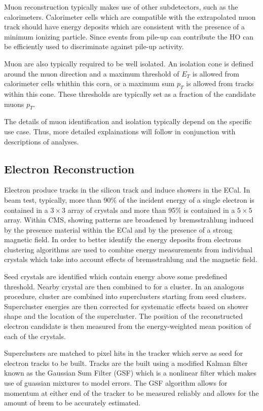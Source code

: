 Muon reconstruction typically makes use of other subdetectors, such
as the calorimeters.  Calorimeter cells which are compatible with 
the extrapolated muon track should have energy deposits which are 
consistent with the presence of a minimum ionizing particle.  
Since events from pile-up can contribute the HO can be efficiently
used to discriminate against pile-up activity.  

Muon are also typically required to be well isolated.  An isolation
cone is defined around the muon direction and a maximum threshold of 
$E_T$ is allowed from calorimeter cells whithin this corn, or a maximum
sum $p_T$ is allowed from tracks within this cone.  These thresholds are
typically set as a fraction of the candidate muons $p_T$.

The details of muon identification and isolation typically depend on
the specific use case.  Thus, more detailed explainations will follow
in conjunction with descriptions of analyses. 

\subsection{Electron Reconstruction}
\label{sec:electronRECO}

Electron produce tracks in the silicon track and induce showers 
in the ECal.  In beam test, typically, more than 90\% of the incident 
energy of a single electron is contained in a $3\times3$ array of 
crystals and more than 95\% is contained in a $5\times5$ array.  
Within CMS, showing patterns are broadened by bremsstrahlung 
induced by the presence material within the ECal and by the
presence of a strong magnetic field.  In order to better identify 
the energy deposits from electrons clustering algorithms are 
used to combine energy measurements from individual crystals which
take into account effects of bremsstrahlung and the magnetic field.  

Seed crystals are identified which contain energy above some predefined
threshold.  Nearby crystal are then combined to for a cluster.  In 
an analogous procedure, cluster are combined into superclusters 
starting from seed clusters.  Supercluster energies are then 
corrected for systematic effects based on shower shape and the
location of the supercluster.  The position of the reconstructed
electron candidate is then measured from the energy-weighted mean
position of each of the crystals.

Superclusters are matched to pixel hits in the tracker which serve 
as seed for electron tracks to be built.  Tracks are the built using
a modified Kalman filter known as the Gaussian Sum Filter (GSF) which
is a nonlinear filter which makes use of guassian mixtures to model
errors.  The GSF algorithm allows for momentum at either end of the 
tracker to be measured reliably and allows for the amount of brem to 
be accurately estimated.  

